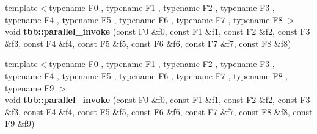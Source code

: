 \begin{DoxyCompactItemize}
\item 
\hypertarget{group__algorithms_gaeca8b72507d67dd023dae728bdc89896}{}{\footnotesize template$<$typename F0 , typename F1 , typename F2 , typename F3 , typename F4 , typename F5 , typename F6 , typename F7 , typename F8 $>$ }\\void {\bfseries tbb\+::parallel\+\_\+invoke} (const F0 \&f0, const F1 \&f1, const F2 \&f2, const F3 \&f3, const F4 \&f4, const F5 \&f5, const F6 \&f6, const F7 \&f7, const F8 \&f8)\label{group__algorithms_gaeca8b72507d67dd023dae728bdc89896}

\item 
\hypertarget{group__algorithms_ga17c9f95fac24b2b7b62f325f511ee7be}{}{\footnotesize template$<$typename F0 , typename F1 , typename F2 , typename F3 , typename F4 , typename F5 , typename F6 , typename F7 , typename F8 , typename F9 $>$ }\\void {\bfseries tbb\+::parallel\+\_\+invoke} (const F0 \&f0, const F1 \&f1, const F2 \&f2, const F3 \&f3, const F4 \&f4, const F5 \&f5, const F6 \&f6, const F7 \&f7, const F8 \&f8, const F9 \&f9)\label{group__algorithms_ga17c9f95fac24b2b7b62f325f511ee7be}

\end{DoxyCompactItemize}
